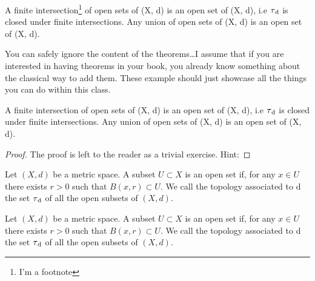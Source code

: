 
\begin{lemma}
A finite intersection\footnote{I'm a footnote} of open sets of (X, d) is 
an open set of (X, d), i.e $\tau\textsubscript{d}$ is closed under 
finite intersections. Any union of open sets of (X, d) is an open set of 
(X, d).
\end{lemma}

You can safely ignore the content of the theorems\ldots I assume that if 
you are interested in having theorems in your book, you already know 
something about the classical way to add them. These example should just 
showcase all the things you can do within this class.

\begin{corollary}
A finite intersection of open sets of (X, d) is an open set of (X, d), 
i.e $\tau\textsubscript{d}$ is closed under finite intersections. Any 
union of open sets of (X, d) is an open set of (X, d).
\end{corollary}

\begin{proof}
The proof is left to the reader as a trivial exercise. Hint: \blindtext
\end{proof}

\begin{definition}
Let $(X, d)$ be a metric space. A subset $U \subset X$ is an open set 
if, for any $x \in U$ there exists $r > 0$ such that $B(x, r) \subset 
U$. We call the topology associated to d the set $\tau\textsubscript{d}$ 
of all the open subsets of $(X, d).$
\end{definition}




\begin{example}
Let $(X, d)$ be a metric space. A subset $U \subset X$ is an open set 
if, for any $x \in U$ there exists $r > 0$ such that $B(x, r) \subset 
U$. We call the topology associated to d the set $\tau\textsubscript{d}$ 
of all the open subsets of $(X, d).$
\end{example}

